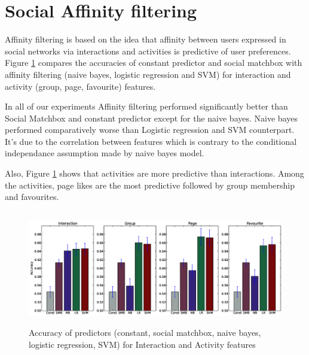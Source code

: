 \section{Social Affinity filtering}

Affinity filtering is based on the idea that affinity between users
expressed in social networks via interactions and activities is
predictive of user preferences. Figure \ref{Fig1} compares the
accuracies of constant predictor and social matchbox with affinity
filtering (naive bayes, logistic regression and SVM) for interaction
and activity (group, page, favourite) features.

In all of our experiments Affinity filtering performed significantly
better than Social Matchbox and constant predictor except for the
naive bayes.  Naive bayes performed comparatively worse than Logistic
regression and SVM counterpart. It's due to the correlation between
features which is contrary to the conditional independance assumption
made by naive bayes model.

Also, Figure \ref{Fig1} shows that activities are more predictive than
interactions. Among the activities, page likes are the most predictive
followed by group membership and favourites.

\begin{figure}[t!]
\centering
\includegraphics[width=230mm, height=50mm]{data/plots/accuracy/accuracy.eps}
\caption{ Accuracy of predictors (constant, social matchbox, naive bayes, logistic regression, SVM) for Interaction and Activity  features }
\label{Fig1}
\end{figure}
